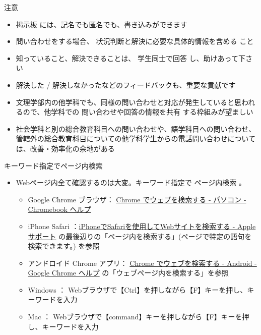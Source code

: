 \documentclass[a4j,10pt]{jsarticle}
\def\lthtmlcheckvsize{\ifdim\ht\sizebox<\vsize 
  \ifdim\wd\sizebox<\hsize\expandafter\hfill\fi \expandafter\vfill
  \else\expandafter\vss\fi}%
\begin{document}
{\begin{frame}
\begin{block}{注意}
\begin{itemize}
\begin{enumerate}
\begin{itemize}
\begin{itemize}
\end{itemize}
\item \alert{掲示板} には、記名でも匿名でも、書き込みができます
\item 問い合わせをする場合、 \alert{状況判断と解決に必要な具体的情報を含める} こと
\item 知っていること、解決できることは、 \alert{学生同士で回答} し、助けあって下さい
\item 解決した / 解決しなかったなどのフィードバックも、重要な貢献です
\end{itemize}
\end{enumerate}
\end{itemize}
\par
\begin{itemize}
\item 文理学部内の他学科でも、同様の問い合わせと対応が発生していると思われるので、他学科での \alert{問い合わせや回答の情報を共有} する枠組みが望ましい
\par
\item 社会学科と別の総合教育科目への問い合わせや、語学科目への問い合わせ、管轄外の総合教育科目についての他学科学生からの電話問い合わせについては、改善・効率化の余地がある
\end{itemize}
\end{block}
\par
\begin{block}{キーワード指定でページ内検索}
\begin{itemize}
\item Webページ内全て確認するのは大変。キーワード指定で \alert{ページ内検索} 。
\begin{itemize}
\item Google Chrome ブラウザ： \href{https://support.google.com/chromebook/answer/95440?co=GENIE.Platform\%3DDesktop\&hl=ja}{Chrome でウェブを検索する - パソコン - Chromebook ヘルプ}
\item iPhone Safari ：\href{https://support.apple.com/ja-jp/guide/iphone/iph6297b394b/ios}{iPhoneでSafariを使用してWebサイトを検索する - Apple サポート} の最後辺りの「ページ内を検索する」(ページで特定の語句を検索できます。) を参照
\item アンドロイド Chrome アプリ： \href{https://support.google.com/chrome/answer/95440?co=GENIE.Platform\%3DAndroid\&hl=ja}{Chrome でウェブを検索する - Android - Google Chrome ヘルプ} の「ウェブページ内を検索する」を参照
\item Windows ： Webブラウザで【Ctrl】を押しながら【F】キーを押し、キーワードを入力
\item Mac ： Webブラウザで【command】キーを押しながら【F】キーを押し、キーワードを入力
\end{itemize}
\end{itemize}
\end{block}
\end{frame}%
\lthtmlfigureZ
\lthtmlcheckvsize\clearpage}
\end{document}
